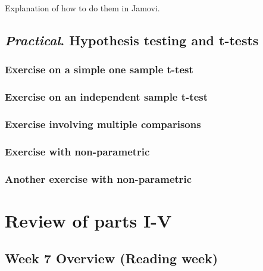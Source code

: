 \documentclass[
]{scrbook}
\begin{document}
Explanation of how to do them in Jamovi.

\hypertarget{practical.-hypothesis-testing-and-t-tests}{%
\chapter{\texorpdfstring{\emph{Practical}. Hypothesis testing and t-tests}{Practical. Hypothesis testing and t-tests}}\label{practical.-hypothesis-testing-and-t-tests}}

\hypertarget{exercise-on-a-simple-one-sample-t-test}{%
\section{Exercise on a simple one sample t-test}\label{exercise-on-a-simple-one-sample-t-test}}

\hypertarget{exercise-on-an-independent-sample-t-test}{%
\section{Exercise on an independent sample t-test}\label{exercise-on-an-independent-sample-t-test}}

\hypertarget{exercise-involving-multiple-comparisons}{%
\section{Exercise involving multiple comparisons}\label{exercise-involving-multiple-comparisons}}

\hypertarget{exercise-with-non-parametric}{%
\section{Exercise with non-parametric}\label{exercise-with-non-parametric}}

\hypertarget{another-exercise-with-non-parametric}{%
\section{Another exercise with non-parametric}\label{another-exercise-with-non-parametric}}

\hypertarget{part-review-of-parts-i-v}{%
\part{Review of parts I-V}\label{part-review-of-parts-i-v}}

\hypertarget{Week7}{%
\chapter*{Week 7 Overview (Reading week)}\label{Week7}}
\end{document}
